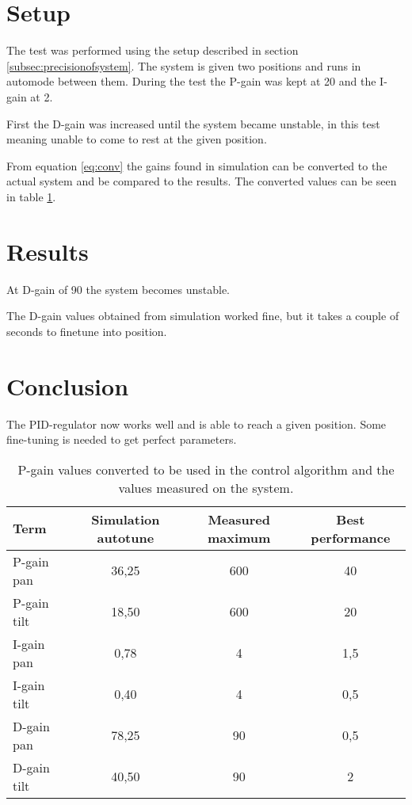 \section*{Setup}
The test was performed using the setup described in
section \ref{subsec:precisionofsystem}. The system is given two positions and runs in automode between them. During the test
the P-gain was kept at 20 and the I-gain at 2.

First the D-gain was increased until the system became unstable, in this test
meaning unable to come to rest at the given position.

From equation \ref{eq:conv} the gains found in simulation can be converted to the actual
system and be compared to the results. The converted values can be seen in
table \ref{tab:actual_gain_values}. 

\section*{Results}
At D-gain of 90 the system becomes unstable.

The D-gain values obtained from simulation worked fine, but it takes a couple of
seconds to finetune into position.

\section*{Conclusion}
The PID-regulator now works well and is able to reach a given position. Some
fine-tuning is needed to get perfect parameters.

\begin{table}[htb]
	\centering
	\begin{tabular}{lccc}			
	Term & Simulation autotune & Measured maximum & Best performance  \\
	\midrule								
	P-gain pan & 36,25 & 600 & 40 \\
	P-gain tilt   & 18,50 & 600 & 20 \\
	I-gain pan  & 0,78 & 4 & 1,5 \\
	I-gain tilt   & 0,40  & 4 & 0,5 \\
	D-gain pan & 78,25 & 90 & 0,5 \\
	D-gain tilt   & 40,50 & 90 & 2 \\
	\end{tabular}
	\caption{P-gain values converted to be used in the control algorithm and the values measured on the system.}				
	\label{tab:actual_gain_values}			
\end{table}

